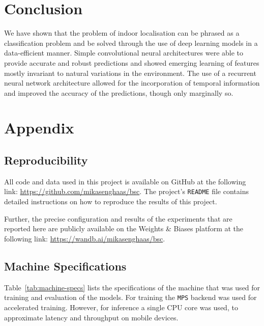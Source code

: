 \documentclass[a4paper]{article}
\begin{document}

  \section{Conclusion} %
  \label{sec:conclusion}

  We have shown that the problem of indoor localisation can be phrased as a
  classification problem and be solved through the use of deep learning models
  in a data-efficient manner.
  Simple convolutional neural architectures were able to provide accurate and
  robust predictions and showed emerging learning of features mostly invariant
  to natural variations in the environment.
  The use of a recurrent neural network architecture allowed for the
  incorporation of temporal information and improved the accuracy of the
  predictions, though only marginally so.


  \newpage
  
  


  \newpage
  \section{Appendix} %
  \label{sec:appendix}

  \subsection{Reproducibility} %
  \label{sub:reproducibility}

  All code and data used in this project is available on GitHub at the
  following link: \url{https://github.com/mikasenghaas/bsc}. The project's 
  \texttt{README} file contains detailed instructions on how to reproduce the
  results of this project.

  Further, the precise configuration and results of the experiments that are
  reported here are publicly available on the Weights \& Biases platform at the
  following link: \url{https://wandb.ai/mikasenghaas/bsc}.


  \subsection{Machine Specifications} %
  \label{sub:machine-specs}

  Table~\ref{tab:machine-specs} lists the specifications of the machine that was
  used for training and evaluation of the models. For training the \texttt{MPS}
  backend was used for accelerated training. However, for inference a single CPU
  core was used, to approximate latency and throughput on mobile devices.
\end{document}
